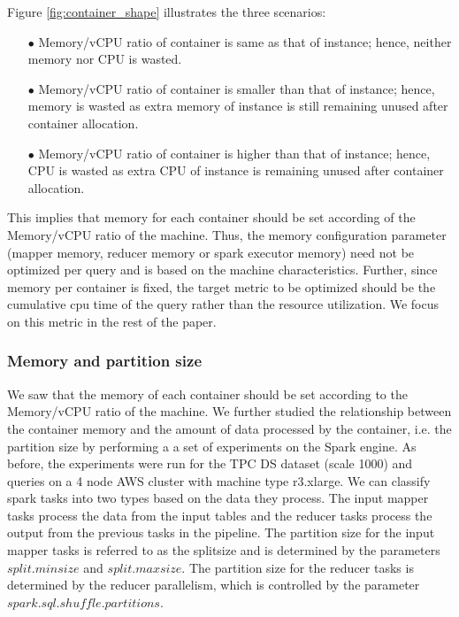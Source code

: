 Figure \ref{fig:container_shape} illustrates the three scenarios:
\begin{enumerate}[label=(\alph*)]
	\item[$\bullet$] Memory/vCPU ratio of container is same as that of instance; hence, neither memory nor CPU is wasted. 
	\item[$\bullet$] Memory/vCPU ratio of container is smaller than that of instance; hence, memory is wasted as extra memory of instance is still remaining unused after container allocation.
	\item[$\bullet$] Memory/vCPU ratio of container is higher than that of instance; hence, CPU is wasted as extra CPU of instance is remaining unused after container allocation.
\end{enumerate}
This implies that memory for each container should be set according of the Memory/vCPU ratio of the machine. Thus, the memory configuration parameter (mapper memory, reducer memory or spark executor memory) need not be optimized per query and is based on the machine characteristics. Further, since memory per container is fixed, the target metric to be optimized should be the cumulative cpu time of the query rather than the resource utilization. We focus on this metric in the rest of the paper.


\subsubsection*{Memory and partition size}
We saw that the memory of each container should be set according to the Memory/vCPU ratio of the machine. We further studied the relationship between the container memory and the amount of data processed by the container, i.e. the partition size by performing a a set of experiments on the Spark engine. As before, the experiments were run for the TPC DS dataset (scale 1000) and queries on a 4 node AWS cluster with machine type r3.xlarge. We can classify spark tasks into two types based on the data they process. The input mapper tasks process the data from the input tables and the reducer tasks process the output from the previous tasks in the pipeline. The partition size for the input mapper tasks is referred to as the splitsize and is determined by the parameters %
$split.minsize$ and %
$split.maxsize$. The partition size for the reducer tasks is determined by the reducer parallelism, which is controlled by the parameter $spark.sql.shuffle.partitions$. 

